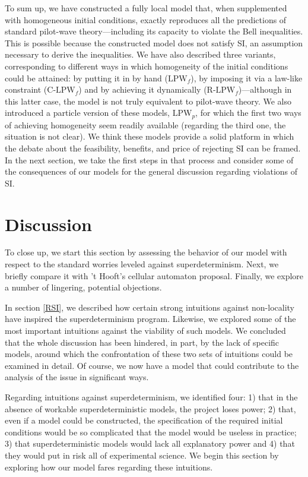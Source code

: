 \documentclass[letterpaper,12pt]{article}
\begin{document}
To sum up, we have constructed a fully local model that, when supplemented with homogeneous initial conditions, exactly reproduces all the predictions of standard pilot-wave theory---including its capacity to violate the Bell inequalities. This is possible because the constructed model does not satisfy SI, an assumption necessary to derive the inequalities. We have also described three variants, 
corresponding to different ways in which homogeneity of the initial conditions could be attained: by putting it in by hand ($\text{LPW}_f$), by imposing it via a law-like constraint ($\text{C-LPW}_f$) and by achieving it dynamically ($\text{R-LPW}_f$)---although in this latter case, the model is not truly equivalent to pilot-wave theory. We also introduced a particle version of these models, $\text{LPW}_p$, for which the first two ways of achieving homogeneity seem readily available (regarding the third one, the situation is not clear). We think these models provide a solid platform in which the debate about the feasibility, benefits, and price of rejecting SI can be framed. In the next section, we take the first steps in that process and consider some of the consequences of our models for the general discussion regarding violations of SI.

\section{Discussion}
\label{Dis}
To close up, we start this section by assessing the behavior of our model with respect to the standard worries leveled against superdeterminism. Next, we briefly compare it with 't Hooft's cellular automaton proposal. Finally, we explore a number of lingering, potential objections.

In section \ref{RSI}, we described how certain strong intuitions against non-locality have inspired the superdeterminism program. Likewise, we explored some of the most important intuitions against the viability of such models. We concluded that the whole discussion has been hindered, in part, by the lack of specific models, around which the confrontation of these two sets of intuitions could be examined in detail. Of course, we now have a model that could contribute to the analysis of the issue in significant ways.

Regarding intuitions against superdeterminism, we identified four: 1) that in the absence of workable superdeterministic models, the project loses power; 2) that, even if a model could be constructed, the specification of the required initial conditions would be so complicated that the model would be useless in practice; 3) that superdeterministic models would lack all explanatory power and 4) that they would put in risk all of experimental science. We begin this section by exploring how our model fares regarding these intuitions. 
\end{document}
